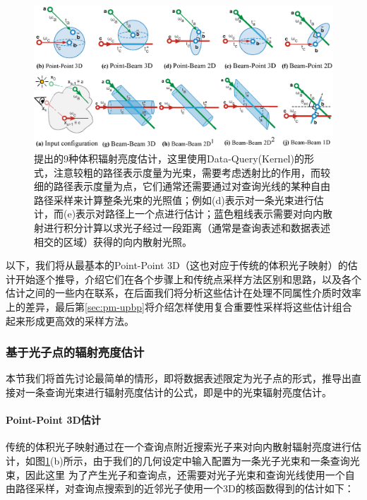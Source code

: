 \begin{figure}
\begin{fullwidth}
	\includegraphics[width=1.0\thewidth]{figures/pm/estimators}
	\caption{\cite{a:AComprehensiveTheoryofVolumetricRadianceEstimationusingPhotonPointsandBeams}提出的9种体积辐射亮度估计，这里使用Data-Query(Kernel)的形式，注意较粗的路径表示度量为光束，需要考虑透射比的作用，而较细的路径表示度量为点，它们通常还需要通过对查询光线的某种自由路径采样来计算整条光束的光照值；例如(d)表示对一条光束进行估计，而(e)表示对路径上一个点进行估计；蓝色粗线表示需要对向内散射进行积分计算以求光子经过一段距离（通常是查询表述和数据表述相交的区域）获得的向内散射光照。}
	\label{f:pm-estimators}
\end{fullwidth}
\end{figure}

以下，我们将从最基本的Point-Point 3D（这也对应于传统的体积光子映射）的估计开始逐个推导，介绍它们在各个步骤上和传统点采样方法区别和思路，以及各个估计之间的一些内在联系，在后面我们将分析这些估计在处理不同属性介质时效率上的差异，最后第\ref{sec:pm-upbp}将介绍怎样使用复合重要性采样将这些估计组合起来形成更高效的采样方法。




\subsubsection{基于光子点的辐射亮度估计}
本节我们将首先讨论最简单的情形，即将数据表述限定为光子点的形式，推导出直接对一条查询光束进行辐射亮度估计的公式，即是\cite{a:TheBeamRadianceEstimateforVolumetricPhotonMapping}中的光束辐射亮度估计。



\paragraph{Point-Point 3D估计}
传统的体积光子映射通过在一个查询点附近搜索光子来对向内散射辐射亮度进行估计，如图\ref{f:pm-estimators}(b)所示，由于我们的几何设定中输入配置为一条光子光束和一条查询光束，因此这里 为了产生光子和查询点，还需要对光子光束和查询光线使用一个自由路径采样，对查询点搜索到的近邻光子使用一个3D的核函数得到的估计如下：

